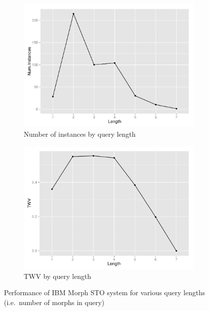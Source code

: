 \documentclass[a4paper,oneside,reqno]{amsart}
\begin{document}
\begin{figure}[ht!]
  \begin{subfigure}{0.49\textwidth}
    \includegraphics[scale=0.5]{Figures/length-numInstances-ibm-morph-sto.pdf}
    \caption{Number of instances by query length}
    \label{fig:morph-length-numInstances}
  \end{subfigure}
  \begin{subfigure}{0.49\textwidth}
    \includegraphics[scale=0.5]{Figures/length-twv-ibm-morph-sto.pdf}
    \caption{TWV by query length}
    \label{fig:morph-length-twv}
  \end{subfigure}
  \caption{Performance of IBM Morph STO system for various query lengths (i.e.\
  number of morphs in query)}
\end{figure}
\end{document}
